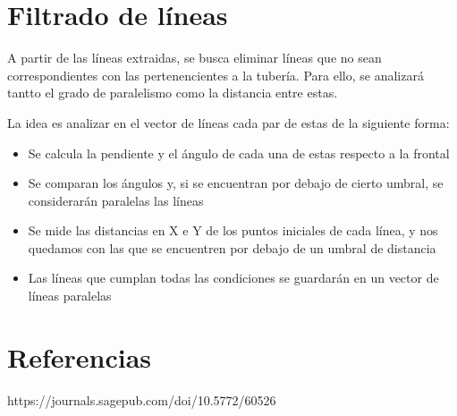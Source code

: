 \documentclass[12pt, a4paper]{article}
\begin{document}
\section{Filtrado de líneas}

A partir de las líneas extraidas, se busca eliminar líneas que no sean correspondientes con las pertenencientes a la tubería. Para ello, se analizará 
tantto el grado de paralelismo como la distancia entre estas. 

La idea es analizar en el vector de líneas cada par de estas de la siguiente forma: 

\begin{itemize}
    \item Se calcula la pendiente y el ángulo de cada una de estas respecto a la frontal
    \item Se comparan los ángulos y, si se encuentran por debajo de cierto umbral, se considerarán paralelas las líneas
    \item Se mide las distancias en X e Y de los puntos iniciales de cada línea, y nos quedamos con las que se encuentren por debajo 
    de un umbral de distancia 
    \item Las líneas que cumplan todas las condiciones se guardarán en un vector de líneas paralelas
\end{itemize}






\section{Referencias}

https://journals.sagepub.com/doi/10.5772/60526

\end{document}
